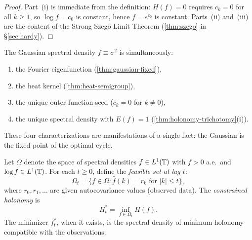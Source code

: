 \begin{proof}
Part~(i) is immediate from the definition: $H(f) = 0$ requires $c_k = 0$ for all $k \geq 1$, so $\log f = c_0$ is constant, hence $f = e^{c_0}$ is constant. Parts~(ii) and~(iii) are the content of the Strong Szeg\H{o} Limit Theorem (\cref{thm:szego} in \S\ref{sec:hardy}).
\end{proof}

\begin{remark}
The Gaussian spectral density $f \equiv \sigma^2$ is simultaneously:
\begin{enumerate}[label=(\alph*)]
\item the Fourier eigenfunction (\cref{thm:gaussian-fixed}),
\item the heat kernel (\cref{thm:heat-semigroup}),
\item the unique outer function seed ($c_k = 0$ for $k \neq 0$),
\item the unique spectral density with $E(f) = 1$ (\cref{thm:holonomy-trichotomy}(i)).
\end{enumerate}
These four characterizations are manifestations of a single fact: the Gaussian is the fixed point of the optimal cycle.
\end{remark}

\begin{definition}\label{def:optimal-cycle}
Let $\Omega$ denote the space of spectral densities $f \in L^1(\mathbb{T})$ with $f > 0$ a.e.\ and $\log f \in L^1(\mathbb{T})$. For each $t \geq 0$, define the \emph{feasible set at lag $t$}:
\[
\Omega_t = \bigl\{f \in \Omega : \widehat{f}(k) = r_k \text{ for } |k| \leq t\bigr\},
\]
where $r_0, r_1, \ldots$ are given autocovariance values (observed data). The \emph{constrained holonomy} is
\[
H_t^* = \inf_{f \in \Omega_t} H(f).
\]
The minimizer $f_t^*$, when it exists, is the spectral density of minimum holonomy compatible with the observations.
\end{definition}

